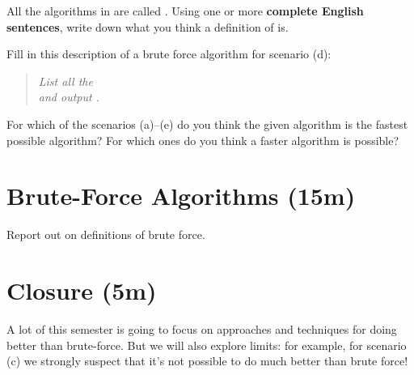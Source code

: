 \documentclass{tufte-handout}
\begin{document}
\begin{questions}
  \newpage
\item All the algorithms in  are called
  .  Using one or more \textbf{complete
    English sentences}, write down what you think a definition of
   is.

  \item \label{q:gcd-brute} Fill in this description of a brute force
    algorithm for scenario (d): \vspace{0.3in}

    \begin{fullwidth}
    \begin{quote}
      \emph{List all the \uline{\hfill} \\[2em] and output
        \uline{\hfill}.}
    \end{quote}
    \end{fullwidth}
  \item For which of the scenarios (a)--(e) do you think the given
    algorithm is the fastest possible algorithm?  For which ones do
    you think a faster algorithm is possible?
\end{questions}

\newpage

\section{Brute-Force Algorithms (15m)}

Report out on definitions of brute force.

\section{Closure (5m)}

A lot of this semester is going to focus on approaches and techniques
for doing better than brute-force.  But we will also explore limits:
for example, for scenario (c) we strongly suspect that it's not
possible to do much better than brute force!
\end{document}
